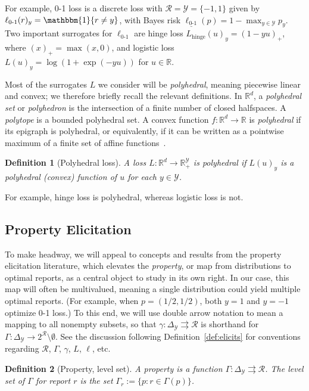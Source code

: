 \documentclass[12pt]{article}
\newcommand{\Comments}{1}
\newcommand{\mynote}[2]{\ifnum\Comments=1\textcolor{#1}{#2}\fi}
\newcommand{\jessie}[1]{\mynote{purple}{[JF: #1]}}
\newcommand{\reals}{\mathbb{R}}
\newcommand{\simplex}{\Delta_\Y}
\newcommand{\R}{\mathcal{R}}
\newcommand{\U}{\mathcal{U}}
\newcommand{\Y}{\mathcal{Y}}
\newcommand{\risk}[1]{\underline{#1}}
\newcommand{\toto}{\rightrightarrows}
\newcommand{\ones}{\mathbbm{1}}
\newcommand{\Ind}[1]{\ones\{#1\}}
\newcommand{\hinge}{L_{\mathrm{hinge}}}
\newcommand{\ellzo}{\ell_{\text{0-1}}}
\newtheorem{definition}{Definition}
\begin{document}
For example, 0-1 loss is a discrete loss with $\R = \Y = \{-1,1\}$
given by $\ellzo(r)_y = \Ind{r \neq y}$, with Bayes risk $\risk{\ellzo}(p) = 1-\max_{y\in\Y} p_y$.
Two important surrogates for $\ellzo$ are hinge loss $\hinge(u)_y = (1-yu)_+$, where $(x)_+ = \max(x,0)$, and logistic loss $L(u)_y = \log(1+\exp(-yu))$ for $u\in\reals$.

Most of the surrogates $L$ we consider will be \emph{polyhedral}, meaning piecewise linear and convex; we therefore briefly recall the relevant definitions.
In $\reals^d$, a \emph{polyhedral set} or \emph{polyhedron} is the intersection of a finite number of closed halfspaces.
A \emph{polytope} is a bounded polyhedral set.
A convex function $f:\reals^d\to\reals$ is \emph{polyhedral} if its epigraph is polyhedral, or equivalently, if it can be written as a pointwise maximum of a finite set of affine functions~\citep{rockafellar1997convex}.
%
\begin{definition}[Polyhedral loss]
  A loss $L: \reals^d \to \reals^{\Y}_+$ is \emph{polyhedral} if $L(u)_y$ is a polyhedral (convex) function of $u$ for each $y\in\Y$.
\end{definition}
%
For example, hinge loss is polyhedral, whereas logistic loss is not.

\subsection{Property Elicitation}

To make headway, we will appeal to concepts and results from the property elicitation literature, which elevates the \emph{property}, or map from distributions to optimal reports, as a central object to study in its own right.
In our case, this map will often be multivalued, meaning a single distribution could yield multiple optimal reports.
(For example, when $p=(1/2,1/2)$, both $y=1$ and $y=-1$ optimize 0-1 loss.)
To this end, we will use double arrow notation to mean a mapping to all nonempty subsets, so that $\gamma: \simplex \toto \R$ is shorthand for $\Gamma: \simplex \to 2^{\R} \setminus \emptyset$.
See the discussion following Definition~\ref{def:elicits} for conventions regarding $\R$, $\Gamma$, $\gamma$, $L$, $\ell$, etc.

\begin{definition}[Property, level set]\label{def:property}
  A \emph{property} is a function $\Gamma:\simplex\toto\R$.
  The \emph{level set} of $\Gamma$ for report $r$ is the set $\Gamma_r := \{p : r \in \Gamma(p)\}$.
\end{definition}
\end{document}
